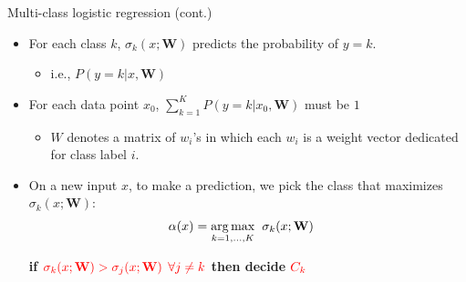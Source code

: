 \documentclass[serif, aspectratio=169]{beamer}
\begin{document}
\begin{frame}{Multi-class logistic regression (cont.)}
    \begin{itemize}
         \item For each class $k$, $\sigma _k(x; \mathbf{W})$ predicts the probability of $y=k$.
            \begin{itemize}
                \item i.e., $P(y=k|x, \mathbf{W})$
            \end{itemize}
        \item For each data point $x_0$, $\sum _{k=1}^{K} P(y=k|x_0, \mathbf{W})$ must be $1$
            \begin{itemize}
                \item $W$ denotes a matrix of $w_i$'s in which each $w_i$ is a weight vector dedicated for class label $i$.
            \end{itemize}
        \item On a new input $x$, to make a prediction, we pick the class that maximizes $\sigma _k(x; \mathbf{W})$:
            \begin{align*}
                \alpha (x) &= \underset{k=1, \dots , K}{\arg\max} \hspace{0.2cm} \sigma _k(x; \mathbf{W}) 
            \end{align*}
            \begin{center}
                \textbf{if $\color{red} \sigma _k(x; \mathbf{W}) > \sigma _j(x; \mathbf{W})$ $\color{red} \forall j \neq k$ then decide $\color{red} C_k$}
            \end{center}
    \end{itemize}
\end{frame}
\end{document}
